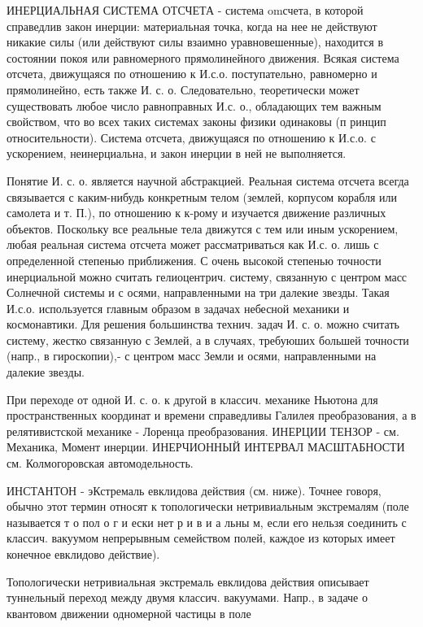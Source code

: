 \documentclass[10pt]{article}
\begin{document}
ИНЕРЦИАЛЬНАЯ СИСТЕМА ОТСЧЕТА - система omсчета, в которой справедлив закон инерции: материальная точка, когда на нее не действуют никакие силы (или действуют силы взаимно уравновешенные), находится в состоянии покоя или равномерного прямолинейного движения. Всякая система отсчета, движущаяся по отношению к И.с.о. поступательно, равномерно и прямолинейно, есть также И. с. о. Следовательно, теоретически может существовать любое число равноправных И.с. о., обладающих тем важным свойством, что во всех таких системах законы физики одинаковы (п ринцип относительности). Система отсчета, движущаяся по отношению к И.с.о. с ускорением, неинерциальна, и закон инерции в ней не выполняется.



Понятие И. с. о. является научной абстракцией. Реальная система отсчета всегда связывается с каким-нибудь конкретным телом (землей, корпусом корабля или самолета и т. П.), по отношению к к-рому и изучается движение различных объектов. Поскольку все реальные тела движутся с тем или иным ускорением, любая реальная система отсчета может рассматриваться как И.с. о. лишь с определенной степенью приближения. С очень высокой степенью точности инерциальной можно считать гелиоцентрич. систему, связанную с центром масс Солнечной системы и с осями, направленными на три далекие звезды. Такая И.с.о. используется главным образом в задачах небесной механики и космонавтики. Для решения большинства технич. задач И. с. о. можно считать систему, жестко связанную с Землей, а в случаях, требуюших большей точности (напр., в гироскопии),- с центром масс Земли и осями, направленными на далекие звезды.



При переходе от одной И. с. о. к другой в классич. механике Ньютона для пространственных координат и времени справедливы Галилея преобразования, а в релятивистской механике - Лоренца преобразования. ИНЕРЦИИ ТЕНЗОР - см. Механика, Момент инерции. ИНЕРЧИОННЫЙ ИНТЕРВАЛ МАСШТАБНОСТИ см. Колмогоровская автомодельность.



ИНСТАНТОН - эКстремаль евклидова действия (см. ниже). Точнее говоря, обычно этот термин относят к топологически нетривиальным экстремалям (поле называется т о пол о г и ески нет р и в и а льны м, если его нельзя соединить с классич. вакуумом непрерывным семейством полей, каждое из которых имеет конечное евклидово действие).



Топологически нетривиальная экстремаль евклидова действия описывает туннельный переход между двумя классич. вакуумами. Напр., в задаче о квантовом движении одномерной частицы в поле
\end{document}
